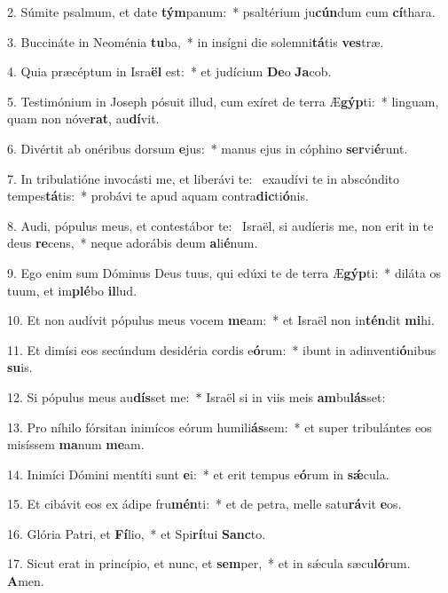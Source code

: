 2. Súmite psalmum, et date \textbf{tým}panum:~*  psaltérium ju\textbf{cún}dum cum \textbf{cí}thara.\

3. Buccináte in Neoménia \textbf{tu}ba,~*  in insígni die solemni\textbf{tá}tis \textbf{ves}træ.\

4. Quia præcéptum in Isra\textbf{ël} est:~*  et judícium \textbf{De}o \textbf{Ja}cob.\

5. Testimónium in Joseph pósuit illud, cum exíret de terra Æ\textbf{gýp}ti:~*  linguam, quam non nóve\textbf{rat}, au\textbf{dí}vit.\

6. Divértit ab onéribus dorsum \textbf{e}jus:~*  manus ejus in cóphino \textbf{ser}vi\textbf{é}runt.\

7. In tribulatióne invocásti me, et liberávi te: \dag\  exaudívi te in abscóndito tempes\textbf{tá}tis:~*  probávi te apud aquam contra\textbf{dic}ti\textbf{ó}nis.\

8. Audi, pópulus meus, et contestábor te: \dag\  Israël, si audíeris me, non erit in te deus \textbf{re}cens,~*  neque adorábis deum \textbf{a}li\textbf{é}num.\

9. Ego enim sum Dóminus Deus tuus, qui edúxi te de terra Æ\textbf{gýp}ti:~*  diláta os tuum, et im\textbf{plé}bo \textbf{il}lud.\

10. Et non audívit pópulus meus vocem \textbf{me}am:~*  et Israël non in\textbf{tén}dit \textbf{mi}hi.\

11. Et dimísi eos secúndum desidéria cordis e\textbf{ó}rum:~*  ibunt in adinventi\textbf{ó}nibus \textbf{su}is.\

12. Si pópulus meus au\textbf{dís}set me:~*  Israël si in viis meis \textbf{am}bu\textbf{lás}set:\

13. Pro níhilo fórsitan inimícos eórum humili\textbf{ás}sem:~*  et super tribulántes eos misíssem \textbf{ma}num \textbf{me}am.\

14. Inimíci Dómini mentíti sunt \textbf{e}i:~*  et erit tempus e\textbf{ó}rum in \textbf{sǽ}cula.\

15. Et cibávit eos ex ádipe fru\textbf{mén}ti:~*  et de petra, melle satu\textbf{rá}vit \textbf{e}os.\

16. Glória Patri, et \textbf{Fí}lio,~*  et Spi\textbf{rí}tui \textbf{Sanc}to.\

17. Sicut erat in princípio, et nunc, et \textbf{sem}per,~*  et in sǽcula sæcu\textbf{ló}rum. \textbf{A}men.\

